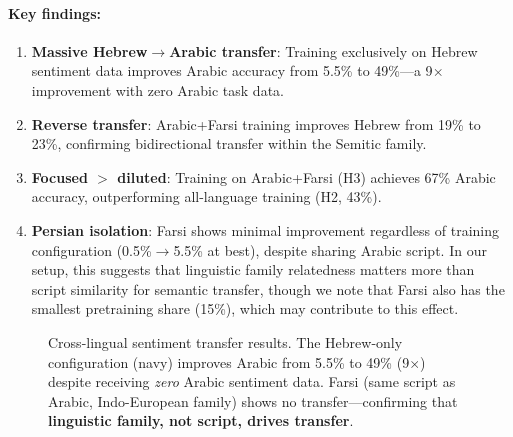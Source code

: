 \documentclass[10pt,twocolumn]{article}
\begin{document}
\paragraph{Key findings:}
\begin{enumerate}
    \item \textbf{Massive Hebrew$\rightarrow$Arabic transfer}: Training exclusively on Hebrew sentiment data improves Arabic accuracy from 5.5\% to 49\%---a 9$\times$ improvement with zero Arabic task data.
    \item \textbf{Reverse transfer}: Arabic+Farsi training improves Hebrew from 19\% to 23\%, confirming bidirectional transfer within the Semitic family.
    \item \textbf{Focused $>$ diluted}: Training on Arabic+Farsi (H3) achieves 67\% Arabic accuracy, outperforming all-language training (H2, 43\%).
    \item \textbf{Persian isolation}: Farsi shows minimal improvement regardless of training configuration (0.5\%$\rightarrow$5.5\% at best), despite sharing Arabic script. In our setup, this suggests that linguistic family relatedness matters more than script similarity for semantic transfer, though we note that Farsi also has the smallest pretraining share (15\%), which may contribute to this effect.
\end{enumerate}

\begin{figure}[H]
\centering
{}
\caption{Cross-lingual sentiment transfer results. The Hebrew-only configuration (navy) improves Arabic from 5.5\% to 49\% (9$\times$) despite receiving \emph{zero} Arabic sentiment data. Farsi (same script as Arabic, Indo-European family) shows no transfer---confirming that \textbf{linguistic family, not script, drives transfer}.}
\label{fig:sentiment_transfer}
\end{figure}
\end{document}
